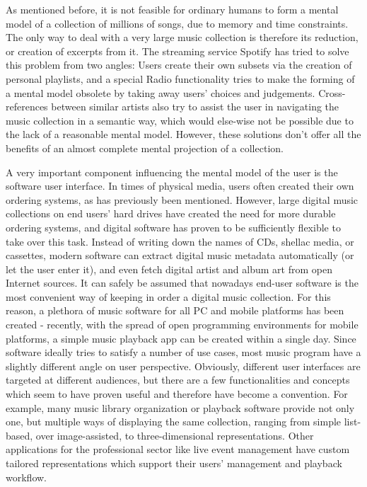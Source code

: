 As mentioned before, it is not feasible for ordinary humans to form a mental model of a collection of millions of songs, due to memory and time constraints. The only way to deal with a very large music collection is therefore its reduction, or creation of excerpts from it. The streaming service Spotify has tried to solve this problem from two angles: Users create their own subsets via the creation of personal playlists, and a special Radio functionality tries to make the forming of a mental model obsolete by taking away users' choices and judgements. Cross-references between similar artists also try to assist the user in navigating the music collection in a semantic way, which would else-wise not be possible due to the lack of a reasonable mental model. However, these solutions don't offer all the benefits of an almost complete mental projection of a collection.

A very important component influencing the mental model of the user is the software user interface. In times of physical media, users often created their own ordering systems, as has previously been mentioned. However, large digital music collections on end users' hard drives have created the need for more durable ordering systems, and digital software has proven to be sufficiently flexible to take over this task. Instead of writing down the names of CDs, shellac media, or cassettes, modern software can extract digital music metadata automatically (or let the user enter it), and even fetch digital artist and album art from open Internet sources. It can safely be assumed that nowadays end-user software is the most convenient way of keeping in order a digital music collection. For this reason, a plethora of music software for all PC and mobile platforms has been created - recently, with the spread of open programming environments for mobile platforms, a simple music playback app can be created within a single day. Since software ideally tries to satisfy a number of use cases, most music program have a slightly different angle on user perspective. Obviously, different user interfaces are targeted at different audiences, but there are a few functionalities and concepts which seem to have proven useful and therefore have become a convention. For example, many music library organization or playback software provide not only one, but multiple ways of displaying the same collection, ranging from simple list-based, over image-assisted, to three-dimensional representations. Other applications for the professional sector like live event management have custom tailored representations which support their users' management and playback workflow.

